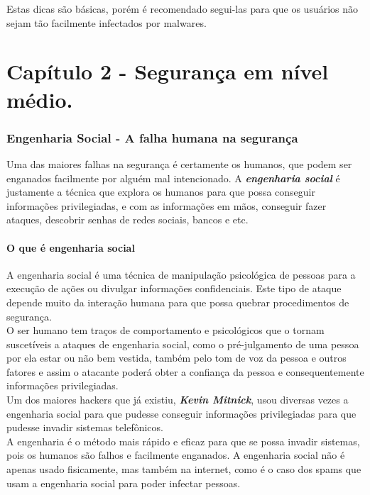 \documentclass[12pt, letterpaper]{report}
\begin{document}
	Estas dicas são básicas, porém é recomendado segui-las para que os usuários não sejam tão facilmente infectados por malwares.\\

\pagebreak

\part{Capítulo 2 - Segurança em nível médio.}

\section*{Engenharia Social - A falha humana na segurança}
	Uma das maiores falhas na segurança é certamente os humanos, que podem ser enganados facilmente por alguém mal intencionado. A \textbf{\textit{engenharia social}} é justamente a técnica que explora os humanos para que possa conseguir informações privilegiadas, e com as informações em mãos, conseguir fazer ataques, descobrir senhas de redes sociais, bancos e etc.\\

\subsection{O que é engenharia social}
	A engenharia social é uma técnica de manipulação psicológica de pessoas para a execução de ações ou divulgar informações confidenciais. Este tipo de ataque depende muito da interação humana para que possa quebrar procedimentos de segurança.\\
	O ser humano tem traços de comportamento e psicológicos que o tornam suscetíveis a ataques de engenharia social, como o pré-julgamento de uma pessoa por ela estar ou não bem vestida, também pelo tom de voz da pessoa e outros fatores e assim o atacante poderá obter a confiança da pessoa e consequentemente informações privilegiadas.\\

	Um dos maiores hackers que já existiu, \textbf{\textit{Kevin Mitnick}}, usou diversas vezes a engenharia social para que pudesse conseguir informações privilegiadas para que pudesse invadir sistemas telefônicos.\\

	A engenharia é o método mais rápido e eficaz para que se possa invadir sistemas, pois os humanos são falhos e facilmente enganados. A engenharia social não é apenas usado fisicamente, mas também na internet, como é o caso dos spams que usam a engenharia social para poder infectar pessoas.\\
\end{document}
